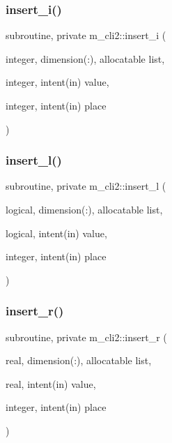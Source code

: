 \mbox{\label{namespacem__cli2_afa6f00a57f1252ba5daa0c440a23ffbb}} 
\subsubsection{\texorpdfstring{insert\+\_\+i()}{insert\_i()}}
{\footnotesize\ttfamily subroutine, private m\+\_\+cli2\+::insert\+\_\+i (\begin{DoxyParamCaption}\item[{integer, dimension(\+:), allocatable}]{list,  }\item[{integer, intent(in)}]{value,  }\item[{integer, intent(in)}]{place }\end{DoxyParamCaption})\hspace{0.3cm}{\ttfamily [private]}}

\mbox{\label{namespacem__cli2_a7e5ee66813d8f6db9d48ebdc350a6b3e}} 
\subsubsection{\texorpdfstring{insert\+\_\+l()}{insert\_l()}}
{\footnotesize\ttfamily subroutine, private m\+\_\+cli2\+::insert\+\_\+l (\begin{DoxyParamCaption}\item[{logical, dimension(\+:), allocatable}]{list,  }\item[{logical, intent(in)}]{value,  }\item[{integer, intent(in)}]{place }\end{DoxyParamCaption})\hspace{0.3cm}{\ttfamily [private]}}

\mbox{\label{namespacem__cli2_ae43e655d3678fcc31824a3e9db3daae1}} 
\subsubsection{\texorpdfstring{insert\+\_\+r()}{insert\_r()}}
{\footnotesize\ttfamily subroutine, private m\+\_\+cli2\+::insert\+\_\+r (\begin{DoxyParamCaption}\item[{real, dimension(\+:), allocatable}]{list,  }\item[{real, intent(in)}]{value,  }\item[{integer, intent(in)}]{place }\end{DoxyParamCaption})\hspace{0.3cm}{\ttfamily [private]}}

